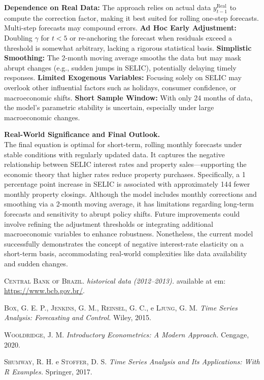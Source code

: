 \documentclass[10pt]{article}
\begin{document}
    \textbf{Dependence on Real Data:} The approach relies on actual data \(y_{t-1}^\mathrm{Real}\) to compute the correction factor, making it best suited for rolling one-step forecasts. Multi-step forecasts may compound errors.
    \textbf{Ad Hoc Early Adjustment:} Doubling \(\gamma\) for \(t<5\) or re-anchoring the forecast when residuals exceed a threshold is somewhat arbitrary, lacking a rigorous statistical basis.
    \textbf{Simplistic Smoothing:} The 2-month moving average smooths the data but may mask abrupt changes (e.g., sudden jumps in SELIC), potentially delaying timely responses.
    \textbf{Limited Exogenous Variables:} Focusing solely on SELIC may overlook other influential factors such as holidays, consumer confidence, or macroeconomic shifts.
    \textbf{Short Sample Window:} With only 24 months of data, the model's parametric stability is uncertain, especially under large macroeconomic changes.


\textbf{Real-World Significance and Final Outlook.}\\[1mm]
The final equation is optimal for short-term, rolling monthly forecasts under stable conditions with regularly updated data. It captures the negative relationship between SELIC interest rates and property sales—supporting the economic theory that higher rates reduce property purchases. Specifically, a 1 percentage point increase in SELIC is associated with approximately 144 fewer monthly property closings. Although the model includes monthly corrections and smoothing via a 2-month moving average, it has limitations regarding long-term forecasts and sensitivity to abrupt policy shifts. Future improvements could involve refining the adjustment thresholds or integrating additional macroeconomic variables to enhance robustness. Nonetheless, the current model successfully demonstrates the concept of negative interest-rate elasticity on a short-term basis, accommodating real-world complexities like data availability and sudden changes.

\clearpage

\begin{thebibliography}{99}

\textsc{Central Bank of Brazil.}
\emph{historical data (2012--2013).}
available at em: \url{https://www.bcb.gov.br/}.

\textsc{Box, G. E. P.}, \textsc{Jenkins, G. M.}, \textsc{Reinsel, G. C.}, e \textsc{Ljung, G. M.}
\emph{Time Series Analysis: Forecasting and Control.}
Wiley, 2015.

\textsc{Wooldridge, J. M.}
\emph{Introductory Econometrics: A Modern Approach.}
Cengage, 2020.

\textsc{Shumway, R. H.} e \textsc{Stoffer, D. S.}
\emph{Time Series Analysis and Its Applications: With R Examples.}
Springer, 2017.

\end{thebibliography}
\end{document}
